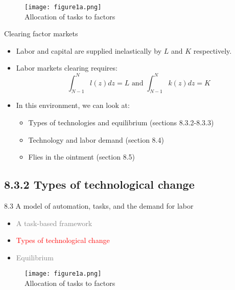 \documentclass[notes=show]{beamer}
\begin{document}
\newpage
\begin{center}
\begin{figure}
\texttt{[image: figure1a.png]}
\\ Allocation of tasks to factors 
\end{figure} 
\end{center}
\newpage

\begin{frame}{Clearing factor markets}
\begin{itemize}
\item Labor and capital are supplied inelastically by $L$ and $K$ respectively. \medskip
\item Labor markets clearing requires:
\[
\int_{N-1}^{N} l(z)dz = L \text{ and } \int_{N-1}^{N} k(z)dz = K
\]
\item In this environment, we can look at: \medskip
\begin{itemize}
\item Types of technologies and equilibrium (sections 8.3.2-8.3.3) \medskip
\item Technology and labor demand (section 8.4) \medskip
\item Flies in the ointment (section 8.5)
\end{itemize}
\end{itemize}
\end{frame}

\subsection{8.3.2 Types of technological change}

\begin{frame}{8.3 A model of automation, tasks, and the demand for labor}
\begin{itemize}
\item[\textcolor{gray}{8.3.1}] \textcolor{gray}{A task-based framework} \bigskip
\item[\textcolor{red}{8.3.2}] \textcolor{red}{Types of technological change} \bigskip
\item[\textcolor{gray}{8.3.3}] \textcolor{gray}{Equilibrium}
\end{itemize}
\end{frame}

\newpage
\begin{center}
\begin{figure}
\texttt{[image: figure1a.png]}
\\ Allocation of tasks to factors 
\end{figure} 
\end{center}
\newpage
\end{document}
